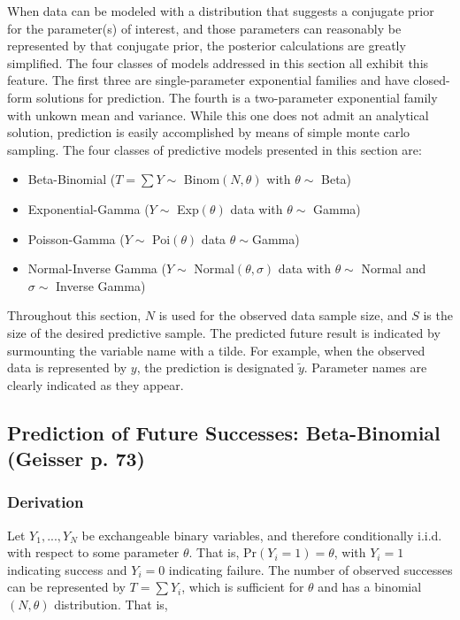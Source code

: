 \documentclass[12pt, a4paper]{article}
\begin{document}
\noindent When data can be modeled with a distribution that suggests a conjugate prior for the parameter(s) of interest, and those parameters can reasonably be represented by that conjugate prior, the posterior calculations are greatly simplified.  The four classes of models addressed in this section all exhibit this feature.  The first three are single-parameter exponential families and have closed-form solutions for prediction.  The fourth is a two-parameter exponential family with unkown mean and variance.  While this one does not admit an analytical solution, prediction is easily accomplished by means of simple monte carlo sampling.  The four classes of predictive models presented in this section are:
\begin{itemize}
  \item Beta-Binomial ($T = \sum Y\sim$ Binom$(N,\theta)$ with $\theta\sim$ Beta)
  \item Exponential-Gamma ($Y\sim$ Exp$(\theta)$ data with $\theta\sim$ Gamma)
  \item Poisson-Gamma ($Y\sim$ Poi$(\theta)$ data $\theta\sim$Gamma)
  \item Normal-Inverse Gamma ($Y\sim$ Normal$(\theta,\sigma)$ data with $\theta\sim$ Normal and $\sigma\sim$ Inverse Gamma)
\end{itemize}

\noindent Throughout this section, $N$ is used for the observed data sample
size, and $S$ is the size of the desired predictive sample. The predicted future result
is indicated by surmounting the variable name with a tilde.  For example, when the observed data is represented by $y$, the prediction is designated $\tilde{y}$. Parameter names are clearly indicated as they appear.

  \subsection{Prediction of Future Successes:  Beta-Binomial (Geisser p. 73)}


    \subsubsection{Derivation}

    \noindent Let $Y_1,...,Y_N$ be exchangeable binary variables, and therefore conditionally i.i.d.  with respect to some parameter $\theta$. That is, Pr$(Y_i = 1) = \theta$, with $Y_i = 1$ indicating success and $Y_i = 0$ indicating failure.  The number of observed successes can be represented by $T = \sum Y_i$, which is sufficient for $\theta$ and has a binomial$(N,\theta)$ distribution.  That is,
\end{document}
